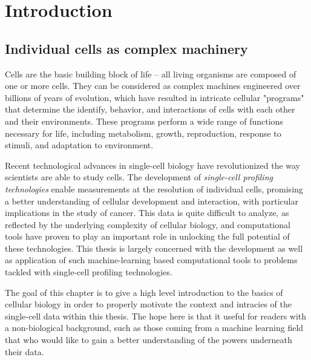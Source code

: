 
\chapter{Introduction}


\section{Individual cells as complex machinery}
Cells are the basic building block of life -- all living organisms are composed of one or more cells.
They can be considered as complex machines engineered over billions of years of evolution,
which have resulted in intricate cellular "programs" that determine the identify, behavior, and interactions of cells with each other and their environments.
These programs perform a wide range of functions necessary for life, including metabolism, growth, reproduction, response to stimuli, and adaptation to environment.

Recent technological advances in single-cell biology have revolutionized the way scientists are able to study cells.
The development of \emph{single-cell profiling technologies} enable measurements at the resolution of individual cells,
promising a better understanding of cellular development and interaction, with particular implications in the study of cancer.
This data is quite difficult to analyze, as reflected by the underlying complexity of cellular biology, and
computational tools have proven to play an important role in unlocking the full potential of these technologies.
This thesis is largely concerned with the development as well as application of such machine-learning based computational tools to problems tackled with single-cell profiling technologies.

The goal of this chapter is to give a high level introduction to the basics of cellular biology in order to properly motivate the context and intracies of the single-cell data within this thesis.
The hope here is that it useful for readers with a non-biological background, such as those coming from a machine learning field that who would like to gain a better understanding of the powers underneath their data.

